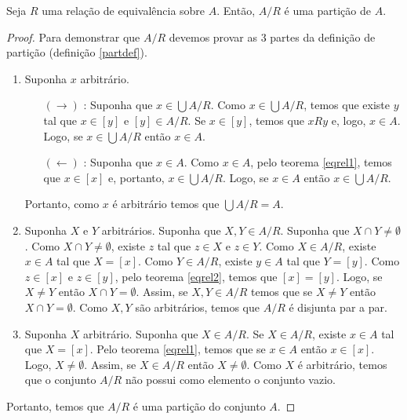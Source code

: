 \begin{Theorem}
Seja $R$ uma relação de equivalência sobre $A$. Então, $A / R$ é uma
partição de $A$.
\end{Theorem}
\begin{proof}
  Para demonstrar que $A / R$ devemos provar as 3 partes da definição
  de partição (definição \ref{partdef}).
\begin{enumerate}
  \item Suponha $x$ arbitrário.
    \begin{enumerate}
         \item[$(\to)$] : Suponha que $x \in \bigcup A /
    R$. Como $x\in \bigcup A / R$, temos que existe $y$ tal que $x \in
    [y]$ e $[y] \in A /R$. Se $x \in [y]$, temos que $xRy$ e, logo, $x
    \in A$. Logo, se $x\in \bigcup A / R$ então $x \in A$.
         \item[$(\leftarrow)$]: Suponha que $x \in A$. Como $x \in A$,
           pelo teorema \ref{eqrel1}, temos que $x \in [x]$ e,
           portanto, $x \in \bigcup A / R$. Logo, se $x \in A$ então
           $x \in \bigcup A / R$.
    \end{enumerate}
    Portanto, como $x$ é arbitrário temos que $\bigcup A / R = A$.
  \item Suponha $X$ e $Y$ arbitrários. Suponha que $X,Y \in A / R$. Suponha que $X \cap Y \neq
    \emptyset$. Como $X \cap Y \neq \emptyset$, existe $z$ tal que $z
    \in X$ e $z \in Y$. Como $X \in A / R$, existe $x \in A$ tal que
    $X = [x]$. Como $Y \in A / R$, existe $y \in A$ tal que $Y =
    [y]$. Como $z \in [x]$ e $z \in [y]$, pelo teorema \ref{eqrel2},
    temos que $[x] = [y]$. Logo, se $X \neq Y$ então $X \cap Y =
    \emptyset$. Assim, se $X ,Y\in A / R$ temos que se $X \neq Y$ então $X \cap Y =
    \emptyset$. Como $X,Y$ são arbitrários, temos que $A / R$ é
    disjunta par a par.
  \item Suponha $X$ arbitrário. Suponha que $X \in A /R$. Se $X \in A
    / R$, existe $x \in A$ tal que $X = [x]$. Pelo teorema
    \ref{eqrel1}, temos que se $x \in A$ então $x \in [x]$. Logo, $X
    \neq \emptyset$. Assim, se $X \in A / R$ então $X \neq \emptyset$.
    Como $X$ é arbitrário, temos que o conjunto $A / R$ não possui
    como elemento o conjunto vazio.
\end{enumerate}
Portanto, temos que $A / R$ é uma partição do conjunto $A$.
\end{proof}

